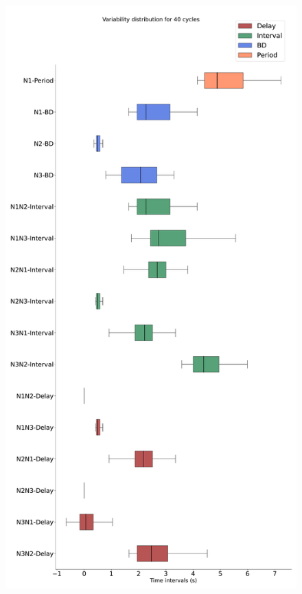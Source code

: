 \begin{figure}[htbp]
\begin{minipage}{0.9\textwidth}
\begin{minipage}[b]{0.45\textwidth}
			\includegraphics[width=\textwidth]{./invariants/data/SUSSEX/CV1a_driven4/images/stim_cv1a4_3phases_boxplot.pdf}
		\end{minipage}
		\begin{minipage}[b]{0.53\textwidth}

\end{minipage}
\end{minipage}
\end{figure}
